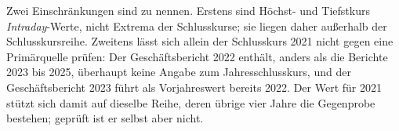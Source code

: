 Zwei Einschr\"ankungen sind zu nennen. Erstens sind H\"ochst- und Tiefstkurs
\emph{Intraday}-Werte, nicht Extrema der Schlusskurse; sie liegen daher
au{\ss}erhalb der Schlusskursreihe. Zweitens l\"asst sich allein der
Schlusskurs 2021 nicht gegen eine Prim\"arquelle pr\"ufen: Der
Gesch\"aftsbericht 2022 enth\"alt, anders als die Berichte 2023 bis 2025,
\"uberhaupt keine Angabe zum Jahresschlusskurs, und der
Gesch\"aftsbericht 2023 f\"uhrt als Vorjahreswert bereits 2022. Der Wert
f\"ur 2021 st\"utzt sich damit auf dieselbe Reihe, deren \"ubrige vier Jahre
die Gegenprobe bestehen; gepr\"uft ist er selbst aber nicht.

